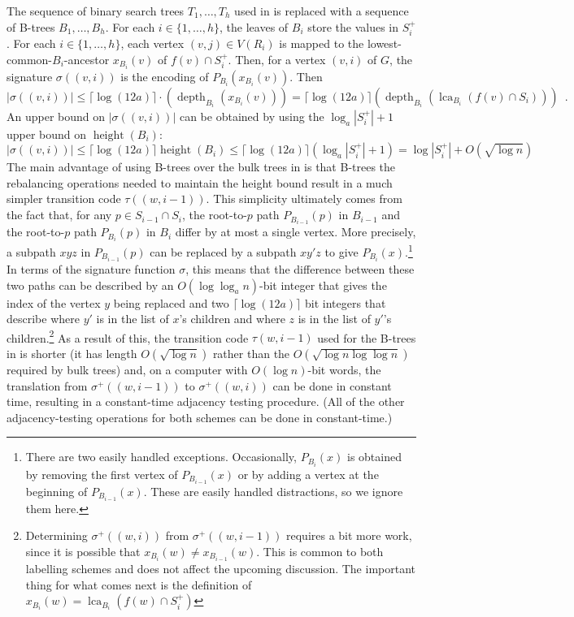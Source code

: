 \documentclass{patmorin}
\DeclareMathOperator{\height}{height}
\DeclareMathOperator{\depth}{depth}
\renewcommand{\le}{\leqslant}
\DeclareMathOperator{\lca}{lca}
\begin{document}
  The sequence of binary search trees $T_1,\ldots,T_h$ used in \cite{alstrup.rauhe:improved} is replaced with a sequence of B-trees $B_1,\ldots,B_h$.
  For each $i\in\{1,\ldots,h\}$,  the leaves of $B_i$ store the values in $S^+_i$.  For each $i\in\{1,\ldots,h\}$, each vertex $(v,j)\in V(R_i)$ is mapped to the lowest-common-$B_i$-ancestor $x_{B_i}(v)$ of $f(v)\cap S^+_i$.  Then, for a vertex $(v,i)$ of $G$, the signature $\sigma((v,i))$ is the encoding of  $P_{B_i}(x_{B_i}(v))$.  Then
  \[
    |\sigma((v,i))| \le \lceil\log (12a)\rceil\cdot(\depth_{B_i}(x_{B_i}(v))) = \lceil\log (12a)\rceil(\depth_{B_i}(\lca_{B_i}(f(v)\cap S_i))) \enspace .
  \]
  An upper bound on $|\sigma((v,i))|$ can be obtained by using the $\log_a |S^+_i|+1$ upper bound on $\height(B_i)$:
  \[
    |\sigma((v,i))|\le \lceil\log (12a)\rceil\height(B_i) \le \lceil\log (12a)\rceil(\log_a |S^+_i| + 1)= \log |S^+_i| + O(\sqrt{\log n})
  \]
  The main advantage of using B-trees over the bulk trees in \cite{dujmovic.esperet.ea:adjacency} is that B-trees the rebalancing operations needed to maintain the height bound result in a much simpler transition code $\tau((w,i-1))$.  This simplicity ultimately comes from the fact that, for any $p\in S_{i-1}\cap S_i$, the root-to-$p$ path $P_{B_{i-1}}(p)$ in $B_{i-1}$ and the root-to-$p$ path $P_{B_i}(p)$ in $B_i$ differ by at most a single vertex.  More precisely, a subpath $xyz$ in $P_{B_{i-1}}(p)$ can be replaced by a subpath $xy'z$ to give $P_{B_i}(x)$.\footnote{There are two easily handled exceptions.  Occasionally, $P_{B_i}(x)$ is obtained by removing the first vertex of $P_{B_{i-1}}(x)$ or by adding a vertex at the beginning of $P_{B_{i-1}}(x)$.  These are easily handled distractions, so we ignore them here.}  In terms of the signature function $\sigma$, this means that the difference between these two paths can be described by an $O(\log\log_a n)$-bit integer that gives the index of the vertex $y$ being replaced and two $\lceil\log (12a)\rceil$ bit integers that describe where $y'$ is in the list of $x$'s children and where $z$ is in the list of $y'$'s children.\footnote{Determining $\sigma^+((w,i))$ from $\sigma^+((w,i-1))$ requires a bit more work, since it is possible that $x_{B_i}(w)\neq x_{B_{i-1}}(w)$.  This is common to both labelling schemes and does not affect the upcoming discussion. The important thing for what comes next is the definition of $x_{B_i}(w)=\lca_{B_i}(f(w)\cap S^+_i)$}  As a result of this, the transition code $\tau(w,i-1)$ used for the B-trees in \cite{alstrup.rauhe:improved} is shorter (it has length $O(\sqrt{\log n})$ rather than the $O(\sqrt{\log n\log\log n})$ required by bulk trees) and, on a computer with $O(\log n)$-bit words, the translation from $\sigma^+((w,i-1))$ to $\sigma^+((w,i))$ can be done in constant time, resulting in a constant-time adjacency testing procedure.  (All of the other adjacency-testing operations for both schemes can be done in constant-time.)
\end{document}
